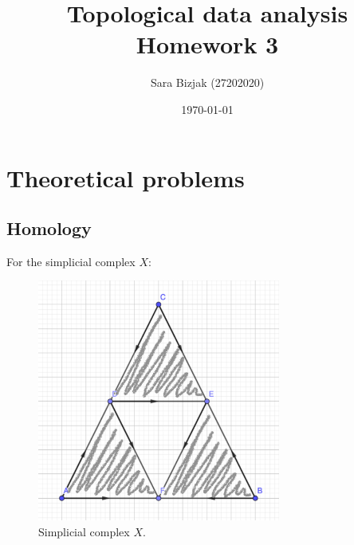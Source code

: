 \documentclass[a4paper,11pt]{article}
\title{Topological data analysis \\ Homework 3}
\author{Sara Bizjak (27202020)}
\date{\today}
\begin{document}
\maketitle


\section{Theoretical problems}
\subsection{Homology}
For the simplicial complex $X$:

\begin{figure}[ht!]
    \centering
    \includegraphics[width=80mm]{1a.png}
    \caption{Simplicial complex $X$.}
\end{figure}
\end{document}
